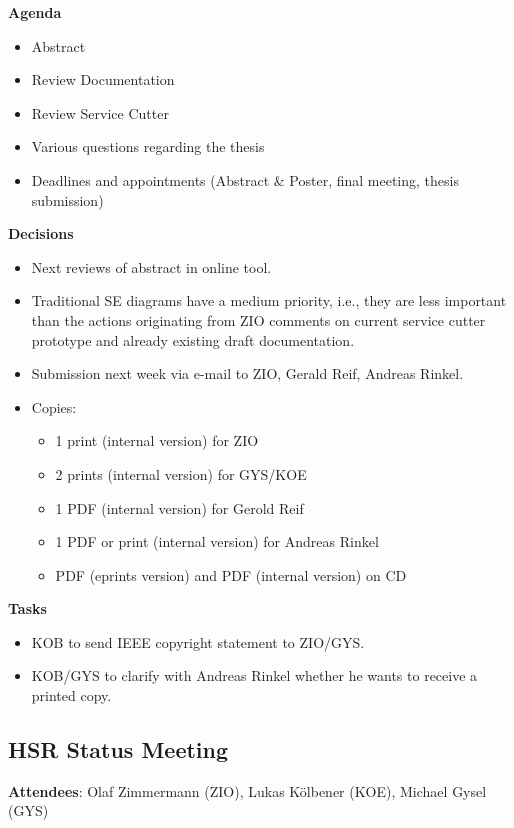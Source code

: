 \textbf{Agenda}

\begin{itemize}
\item Abstract
\item Review Documentation 
\item Review Service Cutter
\item Various questions regarding the thesis
\item Deadlines and appointments (Abstract \& Poster, final meeting, thesis submission)
\end{itemize}

\textbf{Decisions}

\begin{itemize}
\item Next reviews of abstract in online tool.
\item Traditional SE diagrams have a medium priority, i.e., they are less important than the actions originating from ZIO comments on current service cutter prototype and already existing draft documentation.
\item Submission next week via e-mail to ZIO, Gerald Reif, Andreas Rinkel.
\item Copies:
	\begin{itemize}
	\item 1 print (internal version) for ZIO
	\item 2 prints (internal version) for GYS/KOE
	\item 1 PDF (internal version) for Gerold Reif
	\item 1 PDF or print (internal version) for Andreas Rinkel
	\item PDF (eprints version) and PDF (internal version) on CD
	\end{itemize}
\end{itemize}

\textbf{Tasks}

\begin{itemize}
\item KOB to send IEEE copyright statement to ZIO/GYS.
\item KOB/GYS to clarify with Andreas Rinkel whether he wants to receive a printed copy.
\end{itemize}

\subsection{HSR Status Meeting }

\textbf{Attendees}: Olaf Zimmermann (ZIO), Lukas Kölbener (KOE), Michael Gysel (GYS)

